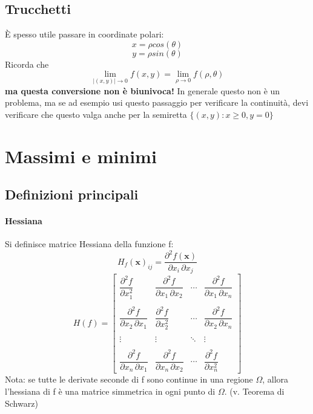 \documentclass[a4paper,12pt]{book}
\begin{document}
\subsection{Trucchetti}
È spesso utile passare in coordinate polari: $$ x = \rho cos(\theta)$$ $$ y = \rho sin(\theta) $$
Ricorda che
$$ \lim_{|(x, y)| \to 0} f(x, y) = \lim_{\rho \to 0} f(\rho, \theta) $$
\textbf{ma questa conversione non è biunivoca!}
In generale questo non è un problema, ma se ad esempio usi questo passaggio per verificare la continuità, devi verificare che questo valga anche per la semiretta $\{(x, y) : x\geq 0, y=0\}$


\section{Massimi e minimi}
\subsection{Definizioni principali}

\paragraph{Hessiana}
Si definisce matrice Hessiana della funzione f:
$$  H_{f}(\mathbf{x})_{ij} = \frac{\partial^2 f(\mathbf{x})}{\partial x_i\, \partial x_j} $$
$$ H(f) = \begin{bmatrix} \dfrac{\partial^2 f}{\partial x_1^2} & \dfrac{\partial^2 f}{\partial x_1\,\partial x_2} & \cdots & \dfrac{\partial^2 f}{\partial x_1\,\partial x_n} \\ \\ \dfrac{\partial^2 f}{\partial x_2\,\partial x_1} & \dfrac{\partial^2 f}{\partial x_2^2} & \cdots & \dfrac{\partial^2 f}{\partial x_2\,\partial x_n} \\ \\ \vdots & \vdots & \ddots & \vdots \\ \\ \dfrac{\partial^2 f}{\partial x_n\,\partial x_1} & \dfrac{\partial^2 f}{\partial x_n\,\partial x_2} & \cdots & \dfrac{\partial^2 f}{\partial x_n^2} \end{bmatrix}$$
Nota: se tutte le derivate seconde di f sono continue in una regione $\Omega$, allora l'hessiana di f è una matrice simmetrica in ogni punto di $\Omega$. (v. Teorema di Schwarz)
\end{document}
